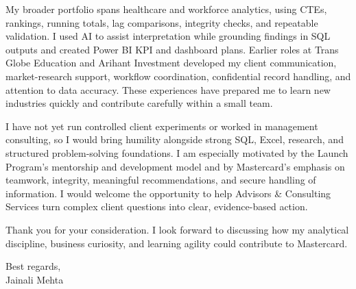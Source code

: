 \documentclass[letterpaper,11pt]{article}
\begin{document}
\bigbreak
My broader portfolio spans healthcare and workforce analytics, using CTEs, rankings, running totals, lag comparisons, integrity checks, and repeatable validation. I used AI to assist interpretation while grounding findings in SQL outputs and created Power BI KPI and dashboard plans. Earlier roles at Trans Globe Education and Arihant Investment developed my client communication, market-research support, workflow coordination, confidential record handling, and attention to data accuracy. These experiences have prepared me to learn new industries quickly and contribute carefully within a small team.

\bigbreak
I have not yet run controlled client experiments or worked in management consulting, so I would bring humility alongside strong SQL, Excel, research, and structured problem-solving foundations. I am especially motivated by the Launch Program's mentorship and development model and by Mastercard's emphasis on teamwork, integrity, meaningful recommendations, and secure handling of information. I would welcome the opportunity to help Advisors \& Consulting Services turn complex client questions into clear, evidence-based action.

\bigbreak
Thank you for your consideration. I look forward to discussing how my analytical discipline, business curiosity, and learning agility could contribute to Mastercard.

\bigbreak
Best regards,\\
Jainali Mehta
\end{document}

